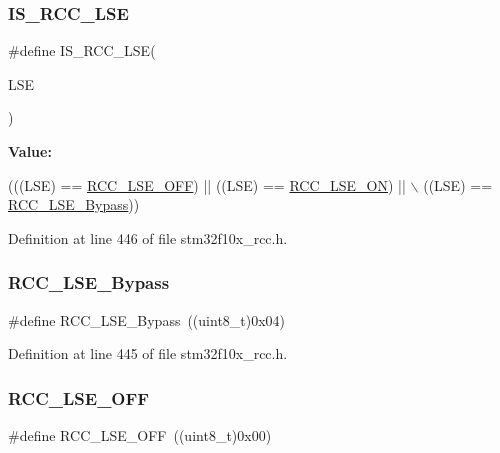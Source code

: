 \subsubsection{\texorpdfstring{I\+S\+\_\+\+R\+C\+C\+\_\+\+L\+SE}{IS\_RCC\_LSE}}
{\footnotesize\ttfamily \#define I\+S\+\_\+\+R\+C\+C\+\_\+\+L\+SE(\begin{DoxyParamCaption}\item[{}]{L\+SE }\end{DoxyParamCaption})}

{\bfseries Value\+:}
\begin{DoxyCode}
(((LSE) == \hyperlink{group___l_s_e__configuration_ga6645c27708d0cad1a4ab61d2abb24c77}{RCC\_LSE\_OFF}) || ((LSE) == \hyperlink{group___l_s_e__configuration_gac981ea636c2f215e4473901e0912f55a}{RCC\_LSE\_ON}) || \(\backslash\)
                         ((LSE) == \hyperlink{group___l_s_e__configuration_gac911af00bffa1bd1b1676f582a8a88e1}{RCC\_LSE\_Bypass}))
\end{DoxyCode}


Definition at line 446 of file stm32f10x\+\_\+rcc.\+h.

\mbox{\label{group___l_s_e__configuration_gac911af00bffa1bd1b1676f582a8a88e1}} 
\subsubsection{\texorpdfstring{R\+C\+C\+\_\+\+L\+S\+E\+\_\+\+Bypass}{RCC\_LSE\_Bypass}}
{\footnotesize\ttfamily \#define R\+C\+C\+\_\+\+L\+S\+E\+\_\+\+Bypass~((uint8\+\_\+t)0x04)}



Definition at line 445 of file stm32f10x\+\_\+rcc.\+h.

\mbox{\label{group___l_s_e__configuration_ga6645c27708d0cad1a4ab61d2abb24c77}} 
\subsubsection{\texorpdfstring{R\+C\+C\+\_\+\+L\+S\+E\+\_\+\+O\+FF}{RCC\_LSE\_OFF}}
{\footnotesize\ttfamily \#define R\+C\+C\+\_\+\+L\+S\+E\+\_\+\+O\+FF~((uint8\+\_\+t)0x00)}



